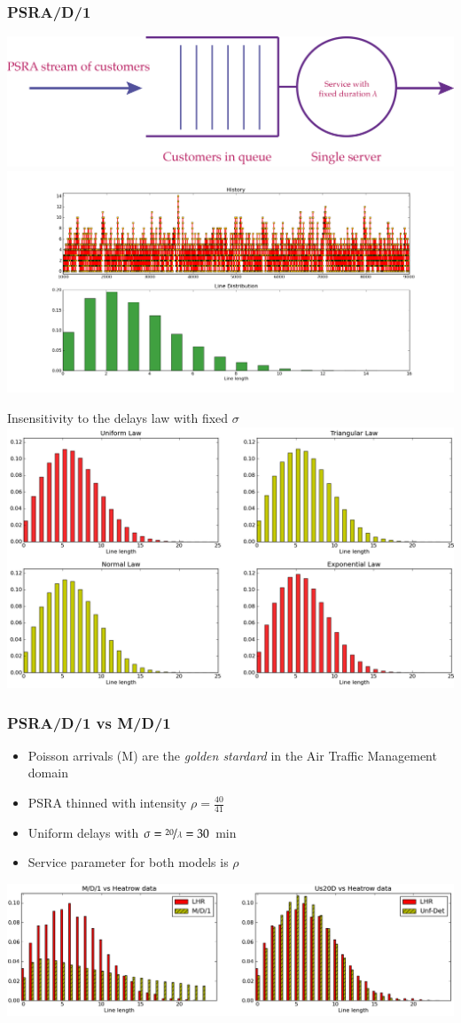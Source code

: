 \documentclass[table,aspectratio=169]{beamer}
\begin{document}
\begin{frame}[t]\frametitle{PSRA/D/1}
    \centering
    \includegraphics[width= .6\textwidth]{psra-d-1}
    \vfill
    \includegraphics[width=.6\textwidth]{U10D}
\end{frame}

\begin{frame}{Insensitivity to the delays law with fixed $\sigma$}
    \centering
    \includegraphics[width=.75\textwidth]{insensitiveness}
\end{frame}

\begin{frame}[t]\frametitle{PSRA/D/1 vs M/D/1}
    \begin{itemize}
        \item Poisson arrivals (M) are the \emph{golden stardard}
        in the Air Traffic Management domain
        \item PSRA thinned with intensity $\rho = \frac{40}{41}$
        \item Uniform delays with $\sigma = \nicefrac{20}{\lambda} = 30$ min
        \item Service parameter for both models is $\rho$
    \end{itemize}
    \centering
    \includegraphics[width=\textwidth]{cills}
\end{frame}
\end{document}
